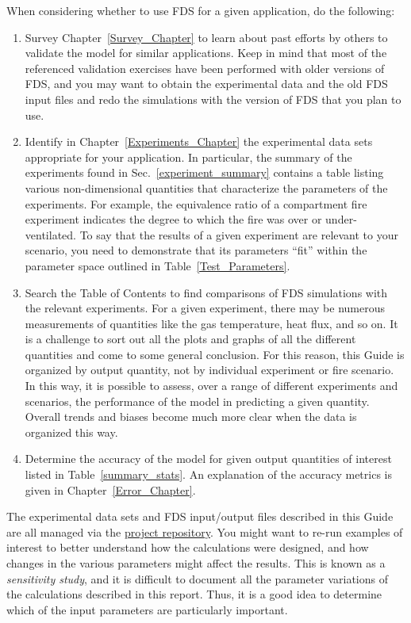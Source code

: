 When considering whether to use FDS for a given application, do the following:
\begin{enumerate}
\item Survey Chapter~\ref{Survey_Chapter} to learn about past efforts by others to validate the model for similar applications. Keep in mind that most of the referenced validation exercises have been performed with older versions of FDS, and you may want to obtain the experimental data and the old FDS input files and redo the simulations with the version of FDS that you plan to use.
\item Identify in Chapter~\ref{Experiments_Chapter} the experimental data sets appropriate for your application. In particular, the summary of the experiments found in Sec.~\ref{experiment_summary} contains a table listing various non-dimensional quantities that characterize the parameters of the experiments. For example, the equivalence ratio of a compartment fire experiment indicates the degree to which the fire was over or under-ventilated. To say that the results of a given experiment are relevant to your scenario, you need to demonstrate that its parameters ``fit'' within the parameter space outlined in Table~\ref{Test_Parameters}.
\item Search the Table of Contents to find comparisons of FDS simulations with the relevant experiments. For a given experiment, there may be numerous measurements of quantities like the gas temperature, heat flux, and so on. It is a challenge to sort out all the plots and graphs of all the different quantities and come to some general conclusion. For this reason, this Guide is organized by output quantity, not by individual experiment or fire scenario. In this way, it is possible to assess, over a range of different experiments and scenarios, the performance of the model in predicting a given quantity. Overall trends and biases become much more clear when the data is organized this way.
\item Determine the accuracy of the model for given output quantities of interest listed in Table~\ref{summary_stats}. An explanation of the accuracy metrics is given in Chapter~\ref{Error_Chapter}.
\end{enumerate}
The experimental data sets and FDS input/output files described in this Guide are all managed via the \href{https://github.com/firemodels/fds}{project repository}. You might want to re-run examples of interest to better understand how the calculations were designed, and how changes in the various parameters might affect the results. This is known as a {\em sensitivity study}, and it is difficult to document all the parameter variations of the calculations described in this report. Thus, it is a good idea to determine which of the input parameters are particularly important.
